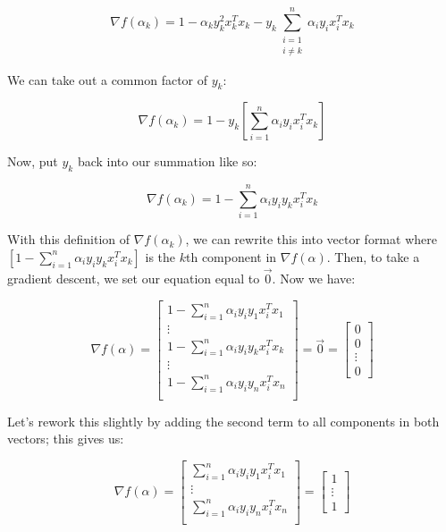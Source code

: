 \[
\nabla f(\alpha_k) = 1 - \alpha_ky_k^2x_k^Tx_k - y_k \sum_{\substack{i=1 \\ i \ne k}}^n \alpha_i y_i x_i^Tx_k
\]

We can take out a common factor of $y_k$:

\[
\nabla f(\alpha_k) = 1 - y_k [\sum\limits_{i=1}^{n} \alpha_iy_ix_i^Tx_k]
\]

Now, put $y_k$ back into our summation like so:

\[
\nabla f(\alpha_k) = 1 - \sum\limits_{i=1}^{n} \alpha_iy_iy_kx_i^Tx_k
\]

With this definition of $\nabla f(\alpha_k)$, we can rewrite this into vector format where $[1 - \sum\limits_{i=1}^{n} \alpha_iy_iy_kx_i^Tx_k]$ is the $k$th component in $\nabla f(\alpha)$. Then, to take a gradient descent, we set our equation equal to $\vec{0}$. Now we have: 

\begin{equation}
\nabla f(\alpha) = \begin{bmatrix}
        1 - \sum\limits_{i=1}^{n} \alpha_iy_iy_1x_i^Tx_1 \\
        \vdots \\
        1 - \sum\limits_{i=1}^{n} \alpha_iy_iy_kx_i^Tx_k \\
        \vdots \\
        1 - \sum\limits_{i=1}^{n} \alpha_iy_iy_nx_i^Tx_n \\
    \end{bmatrix} =
    \vec{0} = \begin{bmatrix}
    0\\
    0\\
    \vdots\\
    0
\end{bmatrix}
\end{equation}

Let's rework this slightly by adding the second term to all components in both vectors; this gives us:

\[
\nabla f(\alpha) = \begin{bmatrix}
        \sum\limits_{i=1}^{n} \alpha_iy_iy_1x_i^Tx_1 \\
        \vdots \\
        \sum\limits_{i=1}^{n} \alpha_iy_iy_nx_i^Tx_n \\
    \end{bmatrix} =
    \begin{bmatrix}
    1\\
    \vdots\\
    1
\end{bmatrix}
\]

